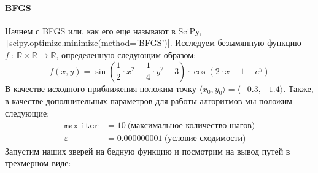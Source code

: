 \documentclass[12pt, a4paper, oneside, final]{article}
\begin{document}
	\paragraph{BFGS}
	Начнем с BFGS или, как его еще называют в SciPy, \texttt|scipy.optimize.minimize(method='BFGS')|.
	Исследуем безымянную функцию $f\ :\ \mathbb{R} \times \mathbb{R} \to \mathbb{R}$, определенную следующим образом:
	\[
		f(x, y) = \sin{\left(\dfrac{1}{2} \cdot x^2 - \dfrac{1}{4} \cdot y^2 + 3\right) \cdot \cos{\left(2 \cdot x + 1 - e^{y}\right)}}
	\]
	В качестве исходного приближения положим точку $\langle x_0, y_0 \rangle = \langle -0.3, -1.4 \rangle$.
	Также, в качестве дополнительных параметров для работы алгоритмов мы положим следующие:
	\begin{align*}
		\mathtt{max\_iter} &= 10~\text{(максимальное количество шагов)} \\
		\varepsilon &= 0.000000001~\text{(условие сходимости)}
	\end{align*}
	Запустим наших зверей на бедную функцию и посмотрим на вывод путей в трехмерном виде:
\end{document}
